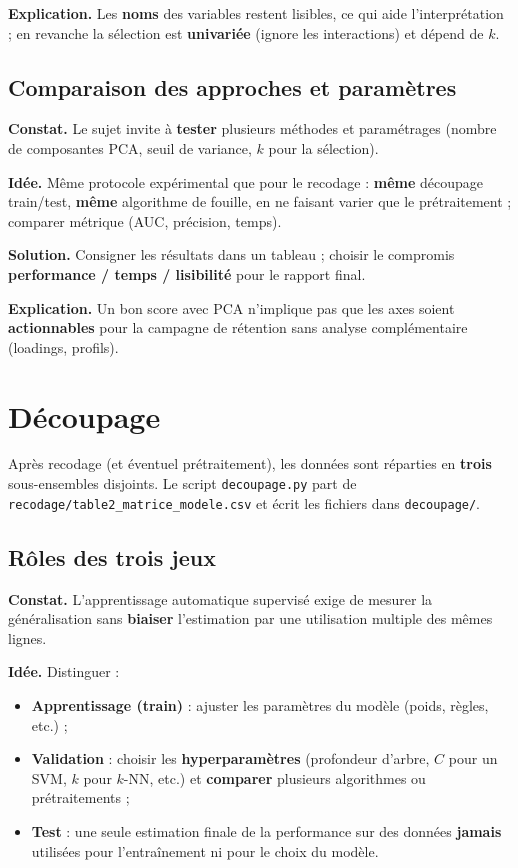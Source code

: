 \documentclass[11pt,a4paper]{article}
\begin{document}
\textbf{Explication.} Les \textbf{noms} des variables restent lisibles, ce qui aide l'interprétation ; en revanche la sélection est \textbf{univariée} (ignore les interactions) et dépend de $k$.

\subsection{Comparaison des approches et paramètres}

\textbf{Constat.} Le sujet invite à \textbf{tester} plusieurs méthodes et paramétrages (nombre de composantes PCA, seuil de variance, $k$ pour la sélection).

\textbf{Idée.} Même protocole expérimental que pour le recodage : \textbf{même} découpage train/test, \textbf{même} algorithme de fouille, en ne faisant varier que le prétraitement ; comparer métrique (AUC, précision, temps).

\textbf{Solution.} Consigner les résultats dans un tableau ; choisir le compromis \textbf{performance / temps / lisibilité} pour le rapport final.

\textbf{Explication.} Un bon score avec PCA n'implique pas que les axes soient \textbf{actionnables} pour la campagne de rétention sans analyse complémentaire (loadings, profils).

\section{Découpage}

Après recodage (et éventuel prétraitement), les données sont réparties en \textbf{trois} sous-ensembles disjoints. Le script \texttt{decoupage.py} part de \texttt{recodage/table2\_matrice\_modele.csv} et écrit les fichiers dans \texttt{decoupage/}.

\subsection{Rôles des trois jeux}

\textbf{Constat.} L'apprentissage automatique supervisé exige de mesurer la généralisation sans \textbf{biaiser} l'estimation par une utilisation multiple des mêmes lignes.

\textbf{Idée.} Distinguer :
\begin{itemize}[leftmargin=*]
  \item \textbf{Apprentissage (train)} : ajuster les paramètres du modèle (poids, règles, etc.) ;
  \item \textbf{Validation} : choisir les \textbf{hyperparamètres} (profondeur d'arbre, $C$ pour un SVM, $k$ pour $k$-NN, etc.) et \textbf{comparer} plusieurs algorithmes ou prétraitements ;
  \item \textbf{Test} : une seule estimation finale de la performance sur des données \textbf{jamais} utilisées pour l'entraînement ni pour le choix du modèle.
\end{itemize}
\end{document}
